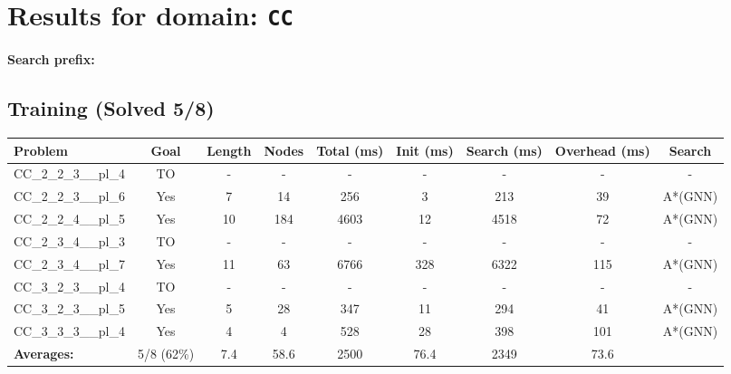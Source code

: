 \documentclass{article}
\begin{document}
\section*{Results for domain: \texttt{CC}}
\textbf{Search prefix:} 
\\[0.5cm]
\subsection*{Training (Solved 5/8)}
\begin{tabular}{lcccccccc}
\toprule
Problem & Goal & Length & Nodes & Total (ms) & Init (ms) & Search (ms) & Overhead (ms) & Search \\
\midrule
CC\_2\_2\_3\_\_pl\_4 & TO & - & - & - & - & - & - & - \\
CC\_2\_2\_3\_\_pl\_6 & Yes & 7 & 14 & 256 & 3 & 213 & 39 & A*(GNN) \\
CC\_2\_2\_4\_\_pl\_5 & Yes & 10 & 184 & 4603 & 12 & 4518 & 72 & A*(GNN) \\
CC\_2\_3\_4\_\_pl\_3 & TO & - & - & - & - & - & - & - \\
CC\_2\_3\_4\_\_pl\_7 & Yes & 11 & 63 & 6766 & 328 & 6322 & 115 & A*(GNN) \\
CC\_3\_2\_3\_\_pl\_4 & TO & - & - & - & - & - & - & - \\
CC\_3\_2\_3\_\_pl\_5 & Yes & 5 & 28 & 347 & 11 & 294 & 41 & A*(GNN) \\
CC\_3\_3\_3\_\_pl\_4 & Yes & 4 & 4 & 528 & 28 & 398 & 101 & A*(GNN) \\
\textbf{Averages:} & 5/8 (62\%) & 7.4 & 58.6 & 2500 & 76.4 & 2349 & 73.6 & \\
\bottomrule
\end{tabular}
\\[0.7cm]
\end{document}
